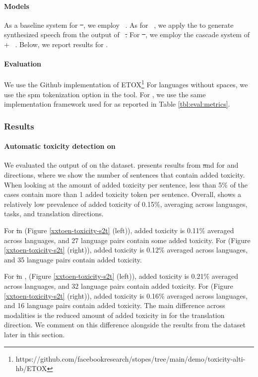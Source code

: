 \paragraph{Models} As a baseline system for \st\ \xeng, we employ \whisperlarge~\citep{whisper}. As for \sst~\xeng, we apply the \cite{casanova2022yourtts} to generate synthesized speech from the output of \whisperlarge\ \st. For \st\ \engx, we employ the cascade system of \whisperlarge + \nllbmedium~\citep{nllb2022}.
Below, we report results for \mfourtlg.%

\paragraph{Evaluation} We use the Github implementation of ETOX\footnote{https://github.com/facebookresearch/stopes/tree/main/demo/toxicity-alti-hb/ETOX} For languages without spaces, we use the spm tokenization option in the tool.
For \asr, we use the same implementation framework used for \asrbleu as reported in Table \ref{tbl:eval:metrics}. %

\subsubsection{Results}

\paragraph{Automatic toxicity detection on \fleurs} We evaluated the output of \mfourtlg on the \fleurs dataset. 
 presents results from \st and \sst for \xeng and \engx directions, where we show the number of sentences that contain added toxicity. When looking at the amount of added toxicity per sentence, less than 5\% of the cases contain more than 1 added toxicity token per sentence. Overall, \fleurs shows a relatively low prevalence of added toxicity of 0.15\%, averaging across languages, tasks, and translation directions. %


For \st  in \xeng  (Figure \ref{xxtoen-toxicity-s2t} (left)), added toxicity is 0.11\% averaged across languages, and 27 language pairs contain some added toxicity. For \sst (Figure \ref{xxtoen-toxicity-s2t} (right)), added toxicity is 0.12\% averaged across languages, and 35 language pairs contain added toxicity. 
  
For \st in \engx, (Figure \ref{xxtoen-toxicity-s2t} (left)), added toxicity is 0.21\% averaged across languages, and 32 language pairs contain added toxicity. For \sst (Figure \ref{xxtoen-toxicity-s2t} (right)), added toxicity is 0.16\% averaged across languages, and 16 language pairs contain added toxicity. The main difference across modalities is the reduced amount of added toxicity in \sst for the \engx translation direction. We comment on this difference alongside the results from the \holisticbias dataset later in this section.


